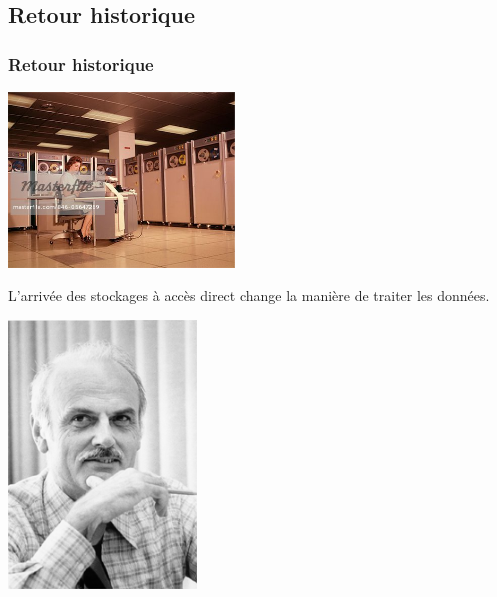 \documentclass[svgnames,11pt]{beamer}
\begin{document}
\subsection{Retour historique}
\begin{frame}
    \frametitle{Retour historique}

    \begin{center}
        \centering
        \includegraphics[width=6cm]{ressources/bande.jpg}
        \label{IMG}
    \end{center}
    \begin{aretenir}[Remarque]
        L'arrivée des stockages à accès direct change la manière de traiter les données.
    \end{aretenir}
\end{frame}
\begin{frame}

    \begin{center}
        \centering
        \includegraphics[width=5cm]{ressources/codd.jpg}
        \label{IMG}
    \end{center}
\end{frame}
\end{document}
